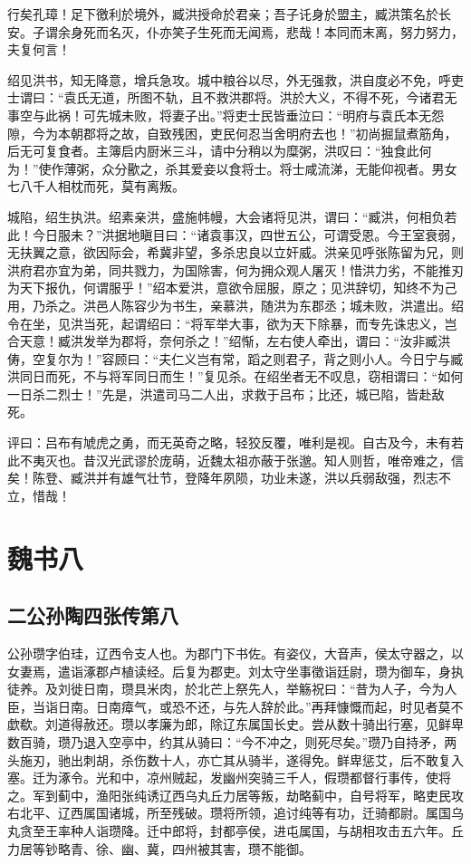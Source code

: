 \documentclass[12pt,UTF8]{ctexbook}
\begin{document}
行矣孔璋！足下徼利於境外，臧洪授命於君亲；吾子讬身於盟主，臧洪策名於长安。子谓余身死而名灭，仆亦笑子生死而无闻焉，悲哉！本同而末离，努力努力，夫复何言！

绍见洪书，知无降意，增兵急攻。城中粮谷以尽，外无强救，洪自度必不免，呼吏士谓曰：“袁氏无道，所图不轨，且不救洪郡将。洪於大义，不得不死，今诸君无事空与此祸！可先城未败，将妻子出。”将吏士民皆垂泣曰：“明府与袁氏本无怨隙，今为本朝郡将之故，自致残困，吏民何忍当舍明府去也！”初尚掘鼠煮筋角，后无可复食者。主簿启内厨米三斗，请中分稍以为糜粥，洪叹曰：“独食此何为！”使作薄粥，众分歠之，杀其爱妾以食将士。将士咸流涕，无能仰视者。男女七八千人相枕而死，莫有离叛。

城陷，绍生执洪。绍素亲洪，盛施帏幔，大会诸将见洪，谓曰：“臧洪，何相负若此！今日服未？”洪据地瞋目曰：“诸袁事汉，四世五公，可谓受恩。今王室衰弱，无扶翼之意，欲因际会，希冀非望，多杀忠良以立奸威。洪亲见呼张陈留为兄，则洪府君亦宜为弟，同共戮力，为国除害，何为拥众观人屠灭！惜洪力劣，不能推刃为天下报仇，何谓服乎！”绍本爱洪，意欲令屈服，原之；见洪辞切，知终不为己用，乃杀之。洪邑人陈容少为书生，亲慕洪，随洪为东郡丞；城未败，洪遣出。绍令在坐，见洪当死，起谓绍曰：“将军举大事，欲为天下除暴，而专先诛忠义，岂合天意！臧洪发举为郡将，奈何杀之！”绍惭，左右使人牵出，谓曰：“汝非臧洪俦，空复尔为！”容顾曰：“夫仁义岂有常，蹈之则君子，背之则小人。今日宁与臧洪同日而死，不与将军同日而生！”复见杀。在绍坐者无不叹息，窃相谓曰：“如何一日杀二烈士！”先是，洪遣司马二人出，求救于吕布；比还，城已陷，皆赴敌死。

评曰：吕布有虓虎之勇，而无英奇之略，轻狡反覆，唯利是视。自古及今，未有若此不夷灭也。昔汉光武谬於庞萌，近魏太祖亦蔽于张邈。知人则哲，唯帝难之，信矣！陈登、臧洪并有雄气壮节，登降年夙陨，功业未遂，洪以兵弱敌强，烈志不立，惜哉！


\part{魏书八}
\chapter{二公孙陶四张传第八}

公孙瓒字伯珪，辽西令支人也。为郡门下书佐。有姿仪，大音声，侯太守器之，以女妻焉，遣诣涿郡卢植读经。后复为郡吏。刘太守坐事徵诣廷尉，瓒为御车，身执徒养。及刘徙日南，瓒具米肉，於北芒上祭先人，举觞祝曰：“昔为人子，今为人臣，当诣日南。日南瘴气，或恐不还，与先人辞於此。”再拜慷慨而起，时见者莫不歔欷。刘道得赦还。瓒以孝廉为郎，除辽东属国长史。尝从数十骑出行塞，见鲜卑数百骑，瓒乃退入空亭中，约其从骑曰：“今不冲之，则死尽矣。”瓒乃自持矛，两头施刃，驰出刺胡，杀伤数十人，亦亡其从骑半，遂得免。鲜卑惩艾，后不敢复入塞。迁为涿令。光和中，凉州贼起，发幽州突骑三千人，假瓒都督行事传，使将之。军到蓟中，渔阳张纯诱辽西乌丸丘力居等叛，劫略蓟中，自号将军，略吏民攻右北平、辽西属国诸城，所至残破。瓒将所领，追讨纯等有功，迁骑都尉。属国乌丸贪至王率种人诣瓒降。迁中郎将，封都亭侯，进屯属国，与胡相攻击五六年。丘力居等钞略青、徐、幽、冀，四州被其害，瓒不能御。
\end{document}
